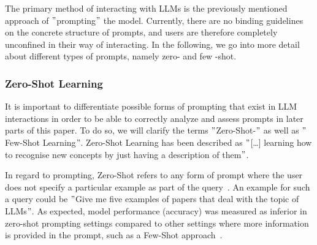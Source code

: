 The primary method of interacting with LLMs is the previously mentioned approach of \("\)prompting\("\) the model.
Currently, there are no binding guidelines on the concrete structure of prompts,
and users are therefore completely unconfined in their way of interacting.
In the following, we go into more detail about different types of prompts, namely zero- and few
-shot.



\subsubsection{Zero-Shot Learning} %
It is important to differentiate possible forms of prompting that exist in LLM interactions in order
to be able to correctly analyze and assess prompts in later parts of this paper.
To do so, we will clarify the terms \("\)Zero-Shot-\("\) as well as \("\)Few-Shot Learning\("\).
Zero-Shot Learning has been described as \("\)[\ldots] learning how to recognise
new concepts by just having a description of them\("\)\cite[p. 1]{feris_embarrassingly_2015}.

In regard to prompting, Zero-Shot refers to any form of prompt where the user does not specify
a particular example as part of the query~\cite[p. 1]{dang_how_2022}.
An example for such a query could be \("\)Give me five examples of papers that deal with the topic
of LLMs\("\).
As expected, model performance (accuracy) was measured as inferior in zero-shot prompting settings compared
to other settings where more information is provided in the prompt, such as a Few-Shot approach~\cite[p. 5]{brown_language_2020}.


